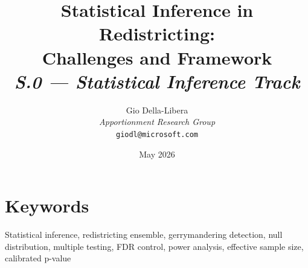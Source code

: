 \documentclass[12pt]{article}
\title{%
  \textbf{Statistical Inference in Redistricting:\\
  Challenges and Framework}\\[0.8em]
  \normalsize\textit{S.0 --- Statistical Inference Track}%
}
\author{%
  Gio Della-Libera\\
  \textit{Apportionment Research Group}\\
  \small\texttt{giodl@microsoft.com}
}
\date{May 2026}
\begin{document}
\maketitle

\begin{abstract}

\end{abstract}

\section*{Keywords}
Statistical inference, redistricting ensemble, gerrymandering detection,
null distribution, multiple testing, FDR control, power analysis,
effective sample size, calibrated p-value

\tableofcontents
\newpage









\end{document}
